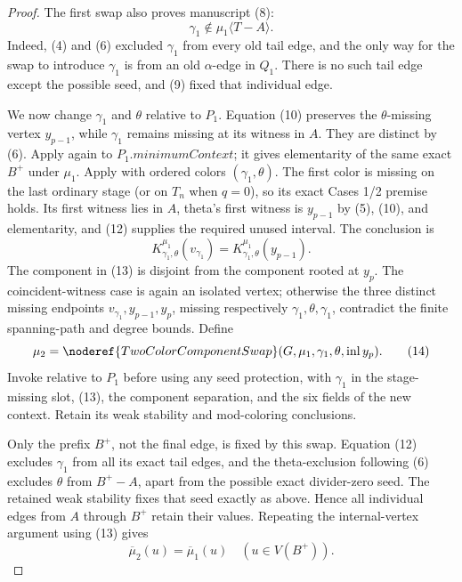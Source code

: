 \begin{proof}
The first swap also proves manuscript (8):
\[
                 \gamma_1\notin\mu_1\langle T-A\rangle .     \tag{12}
\]
Indeed, (4) and (6) excluded \(\gamma_1\) from every old tail edge, and
the only way for the swap to introduce \(\gamma_1\) is from an old
\(\alpha\)-edge in \(Q_1\).  There is no such tail edge except the
possible seed, and (9) fixed that individual edge.

We now change \(\gamma_1\) and \(\theta\) relative to \(P_1\).
Equation (10) preserves the \(\theta\)-missing vertex \(y_{p-1}\), while
\(\gamma_1\) remains missing at its witness in \(A\).  They are distinct
by (6).  Apply 
again to \(P_1.\mathit{minimumContext}\); it gives elementarity of the
same exact \(B^+\) under \(\mu_1\).  Apply  with
ordered colors \((\gamma_1,\theta)\).  The first color is missing on the
last ordinary stage (or on \(T_n\) when \(q=0\)), so its exact Cases 1/2
premise holds.  Its first witness lies in \(A\), theta's first witness is
\(y_{p-1}\) by (5), (10), and elementarity, and (12) supplies the required
unused interval.  The conclusion is
\[
 K^{\mu_1}_{\gamma_1,\theta}(v_{\gamma_1})
       =K^{\mu_1}_{\gamma_1,\theta}(y_{p-1}).                 \tag{13}
\]
The component in (13) is disjoint from the component rooted at \(y_p\).
The coincident-witness case is again an isolated vertex; otherwise the
three distinct missing endpoints
\(v_{\gamma_1},y_{p-1},y_p\), missing respectively
\(\gamma_1,\theta,\gamma_1\), contradict the finite spanning-path and
degree bounds.  Define
\[
 \mu_2=\noderef{TwoColorComponentSwap}
       (G,\mu_1,\gamma_1,\theta,\operatorname{inl}y_p).       \tag{14}
\]
Invoke  relative to \(P_1\) before using
any seed protection, with \(\gamma_1\) in the stage-missing slot, (13),
the component separation, and the six fields of the new context.  Retain
its weak stability and mod-coloring conclusions.

Only the prefix \(B^+\), not the final edge, is fixed by this swap.
Equation (12) excludes \(\gamma_1\) from all its exact tail edges, and
the theta-exclusion following (6) excludes \(\theta\) from
\(B^+-A\), apart from the possible exact divider-zero seed.  The retained
weak stability fixes that seed exactly as above.  Hence all individual
edges from \(A\) through \(B^+\) retain their values.  Repeating the
internal-vertex argument using (13) gives
\[
 \overline\mu_2(u)=\overline\mu_1(u)
                         \quad(u\in V(B^+)).                  \tag{15}
\]


\end{proof}
